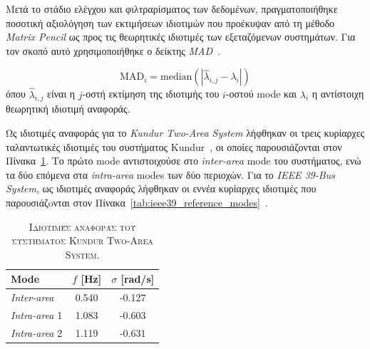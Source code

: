 \documentclass[conference]{IEEEtran}
\begin{document}
Μετά το στάδιο ελέγχου και φιλτραρίσματος των δεδομένων, πραγματοποιήθηκε ποσοτική
αξιολόγηση των εκτιμήσεων ιδιοτιμών που προέκυψαν από τη μέθοδο \textit{Matrix Pencil} ως προς
τις θεωρητικές ιδιοτιμές των εξεταζόμενων συστημάτων. Για τον σκοπό αυτό χρησιμοποιήθηκε
ο δείκτης \textit{MAD}~\cite{modal2018}.

\begin{equation}
\mathrm{MAD}_i = \mathrm{median}\left(\left| \hat{\lambda}_{i,j} - \lambda_i \right|\right)
\label{eq:mad_definition}
\end{equation}
όπου \(\hat{\lambda}_{i,j}\) είναι η \(j\)-οστή εκτίμηση της ιδιοτιμής του \(i\)-οστού
mode και \(\lambda_i\) η αντίστοιχη θεωρητική ιδιοτιμή αναφοράς. 

Ως ιδιοτιμές αναφοράς για το \textit{Kundur Two-Area System} λήφθηκαν οι τρεις κυρίαρχες ταλαντωτικές ιδιοτιμές του
συστήματος Kundur~\cite{estimation2021}, οι οποίες παρουσιάζονται στον
Πίνακα~\ref{tab:kundur_reference_modes}. Το πρώτο mode αντιστοιχούσε στο \textit{inter-area}
mode του συστήματος, ενώ τα δύο επόμενα στα \textit{intra-area} modes των δύο περιοχών.
Για το \textit{IEEE 39-Bus System}, ως ιδιοτιμές αναφοράς λήφθηκαν οι εννέα κυρίαρχες
ιδιοτιμές που παρουσιάζoνται στον Πίνακα~\ref{tab:ieee39_reference_modes}~\cite{sarkar2024drga}.


\begin{table}[!htbp]
\centering
\caption{\textsc{Ιδιοτιμές αναφοράς του συστήματος Kundur Two-Area System.}}
\label{tab:kundur_reference_modes}
\small
\renewcommand{\arraystretch}{1.2}
\setlength{\tabcolsep}{14pt}
\begin{tabular}{lcc}
\toprule
\textbf{Mode} & \textbf{$f$ [Hz]} & \textbf{$\sigma$ [rad/s]} \\
\midrule
\textit{Inter-area}   & 0.540 & -0.127 \\
\textit{Intra-area} 1 & 1.083 & -0.603 \\
\textit{Intra-area} 2 & 1.119 & -0.631 \\
\bottomrule
\end{tabular}
\end{table}
\end{document}
